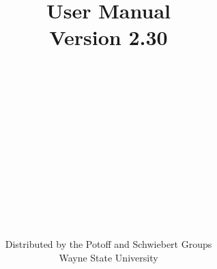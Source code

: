 \posttitle{\end{center}}
\setlength{\parindent}{0cm}



\title{\Huge User Manual\\Version 2.30}
\author{\\\\\\\\\\\\\\\\\\\\\\\\\\Distributed by the Potoff and Schwiebert Groups\\\textcopyright Wayne State University}

\maketitle
\thispagestyle{empty}
\newpage

\tableofcontents
\newpage

